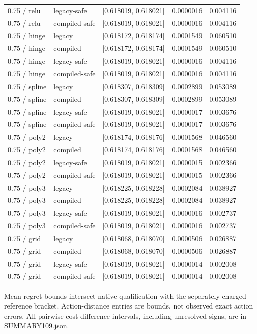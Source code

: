 \begin{longtable}{@{}lllrr@{}}
0.75 / relu & legacy-safe & [0.618019, 0.618021] & 0.0000016 & 0.004116\\
0.75 / relu & compiled-safe & [0.618019, 0.618021] & 0.0000016 & 0.004116\\
0.75 / hinge & legacy & [0.618172, 0.618174] & 0.0001549 & 0.060510\\
0.75 / hinge & compiled & [0.618172, 0.618174] & 0.0001549 & 0.060510\\
0.75 / hinge & legacy-safe & [0.618019, 0.618021] & 0.0000016 & 0.004116\\
0.75 / hinge & compiled-safe & [0.618019, 0.618021] & 0.0000016 & 0.004116\\
0.75 / spline & legacy & [0.618307, 0.618309] & 0.0002899 & 0.053089\\
0.75 / spline & compiled & [0.618307, 0.618309] & 0.0002899 & 0.053089\\
0.75 / spline & legacy-safe & [0.618019, 0.618021] & 0.0000017 & 0.003676\\
0.75 / spline & compiled-safe & [0.618019, 0.618021] & 0.0000017 & 0.003676\\
0.75 / poly2 & legacy & [0.618174, 0.618176] & 0.0001568 & 0.046560\\
0.75 / poly2 & compiled & [0.618174, 0.618176] & 0.0001568 & 0.046560\\
0.75 / poly2 & legacy-safe & [0.618019, 0.618021] & 0.0000015 & 0.002366\\
0.75 / poly2 & compiled-safe & [0.618019, 0.618021] & 0.0000015 & 0.002366\\
0.75 / poly3 & legacy & [0.618225, 0.618228] & 0.0002084 & 0.038927\\
0.75 / poly3 & compiled & [0.618225, 0.618228] & 0.0002084 & 0.038927\\
0.75 / poly3 & legacy-safe & [0.618019, 0.618021] & 0.0000016 & 0.002737\\
0.75 / poly3 & compiled-safe & [0.618019, 0.618021] & 0.0000016 & 0.002737\\
0.75 / grid & legacy & [0.618068, 0.618070] & 0.0000506 & 0.026887\\
0.75 / grid & compiled & [0.618068, 0.618070] & 0.0000506 & 0.026887\\
0.75 / grid & legacy-safe & [0.618019, 0.618021] & 0.0000014 & 0.002008\\
0.75 / grid & compiled-safe & [0.618019, 0.618021] & 0.0000014 & 0.002008\\
\bottomrule\end{longtable}\endgroup
Mean regret bounds intersect native qualification with the separately charged reference bracket. Action-distance entries are bounds, not observed exact action errors. All pairwise cost-difference intervals, including unresolved signs, are in SUMMARY109.json.
